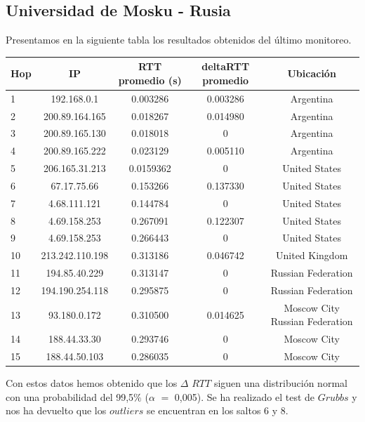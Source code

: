  \subsection{Universidad de Mosku - Rusia}
Presentamos en la siguiente tabla los resultados obtenidos del último monitoreo.

\bigskip

\begin{tabular}{| l | c | c | c | c |}
 \hline 
Hop & IP &  RTT promedio (s)  & deltaRTT promedio & Ubicación\\
\hline 
1  &  192.168.0.1  &  0.003286 &  0.003286 & Argentina\\
\hline 
2  &  200.89.164.165  &  0.018267 &  0.014980 & Argentina\\
\hline 
3  &  200.89.165.130  &  0.018018 &  0 & Argentina\\
\hline 
4  &  200.89.165.222  &  0.023129 &  0.005110 & Argentina\\
\hline 
5  &  206.165.31.213  &  0.0159362 &  0 & United States\\ 
\hline 
6  &  67.17.75.66  &  0.153266 &  0.137330 &  United States\\
\hline 
7  &  4.68.111.121  &  0.144784 &  0 & United States\\ 
\hline 
8  &  4.69.158.253  &  0.267091    &  0.122307 &  United States\\
\hline 
9  &  4.69.158.253  &  0.266443    &  0 & United States\\
\hline 
10  &  213.242.110.198  &  0.313186    &  0.046742 & United Kingdom\\
\hline 
11  &  194.85.40.229  &  0.313147    &  0 & Russian Federation\\
\hline 
12  &  194.190.254.118  &  0.295875    &  0 & Russian Federation\\
\hline 
13  &  93.180.0.172  &  0.310500   &  0.014625 & Moscow City Russian Federation\\
\hline 
14  &  188.44.33.30  &  0.293746    &  0 & Moscow City\\
\hline 
15  &  188.44.50.103  &  0.286035   &  0 & Moscow City\\
\hline 
\end{tabular}

\bigskip
Con estos datos hemos obtenido que los $\Delta$ $RTT$ siguen una distribución normal con una probabilidad del 99,5$\%$ ($\alpha$ $=$ 0,005).
Se ha realizado el test de $Grubbs$ y nos ha devuelto que los $outliers$ se encuentran en los saltos 6 y 8.\\

